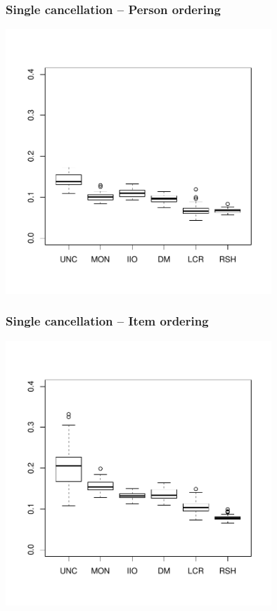 \documentclass[10pt,serif,professionalfont]{beamer}
\begin{document}
\begin{frame}
    \frametitle{Single cancellation -- Person ordering}

    \centering \includegraphics[width=0.75\textwidth]{./figs/violations_columns_weighted.pdf}

\end{frame}

\begin{frame}
    \frametitle{Single cancellation -- Item ordering}

    \centering \includegraphics[width=0.75\textwidth]{./figs/violations_rows_weighted.pdf}

\end{frame}
\end{document}
